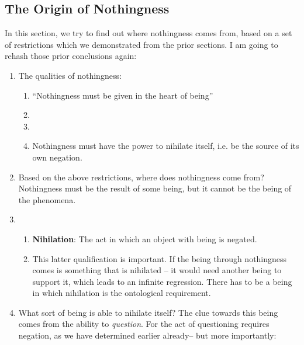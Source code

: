 \subsection{The Origin of Nothingness}
In this section, we try to find out where nothingness comes from, based on a set of restrictions which we demonstrated from the prior sections. I am going to rehash those prior conclusions again:

\begin{enumerate}
  \item The qualities of nothingness:
  \begin{enumerate}
    \item \enquote{Nothingness must be given in the heart of being}
    \item {}
    \item {}
    \item Nothingness must have the power to nihilate itself, i.e. be the source of its own negation.
  \end{enumerate}
  \item Based on the above restrictions, where does nothingness come from? Nothingness must be the result of some being, but it cannot be the being of the phenomena.
  \item {}
  \begin{enumerate}
    \item \textbf{Nihilation}: The act in which an object with being is negated.
    \item This latter qualification is important. If the being through nothingness comes is something that is nihilated -- it would need another being to support it, which leads to an infinite regression. There has to be a being in which nihilation is the ontological requirement.
  \end{enumerate}
  \item What sort of being is able to nihilate itself? The clue towards this being comes from the ability to \emph{question}. For the act of questioning requires negation, as we have determined earlier already-- but more importantly:

\end{enumerate}

